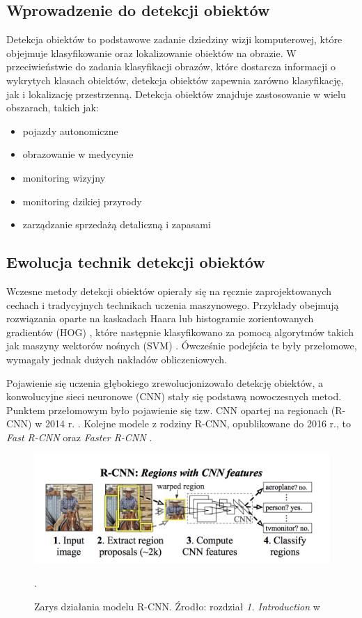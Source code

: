 \subsection{Wprowadzenie do detekcji obiektów}
Detekcja obiektów to podstawowe zadanie dziedziny wizji komputerowej, które objejmuje klasyfikowanie oraz lokalizowanie obiektów na obrazie. W przeciwieństwie do zadania klasyfikacji obrazów, które dostarcza informacji o wykrytych klasach obiektów, detekcja obiektów zapewnia zarówno klasyfikację, jak i lokalizację przestrzenną. Detekcja obiektów znajduje zastosowanie w wielu obszarach, takich jak:
\begin{itemize}
    \item pojazdy autonomiczne \cite{pojazdy_autonomiczne}
    \item obrazowanie w medycynie \cite{obrazowanie_w_medycynie}
    \item monitoring wizyjny \cite{monitoring_wizyjny}
    \item monitoring dzikiej przyrody \cite{wildlife}
    \item zarządzanie sprzedażą detaliczną i zapasami \cite{sklepy}
\end{itemize}

\subsection{Ewolucja technik detekcji obiektów}
Wczesne metody detekcji obiektów opierały się na ręcznie zaprojektowanych cechach i tradycyjnych technikach uczenia maszynowego. Przykłady obejmują rozwiązania oparte na kaskadach Haara \cite{haar} lub histogramie zorientowanych gradientów (HOG) \cite{hog}, które następnie klasyfikowano za pomocą algorytmów takich jak maszyny wektorów nośnych (SVM) \cite{svm}. Ówcześnie podejścia te były przełomowe, wymagały jednak dużych nakładów obliczeniowych.

Pojawienie się uczenia głębokiego zrewolucjonizowało detekcję obiektów, a konwolucyjne sieci neuronowe (CNN) stały się podstawą nowoczesnych metod. Punktem przełomowym było pojawienie się tzw. CNN opartej na regionach (R-CNN) w 2014 r. \cite{RCNN}. Kolejne modele z rodziny R-CNN, opublikowane do 2016 r., to \emph{Fast R-CNN} \cite{Fast-RCNN} oraz \emph{Faster R-CNN} \cite{Faster-RCNN}.

\begin{figure}[H]
    \centering
    \includegraphics[width=\linewidth]{r_technologie/AI_assets/rcnn.png}
    \caption{Zarys działania modelu R-CNN. Źrodło: rozdział \emph{1. Introduction} w \cite{RCNN}}.
    \label{fig:R-CNN-schemat}
\end{figure}

